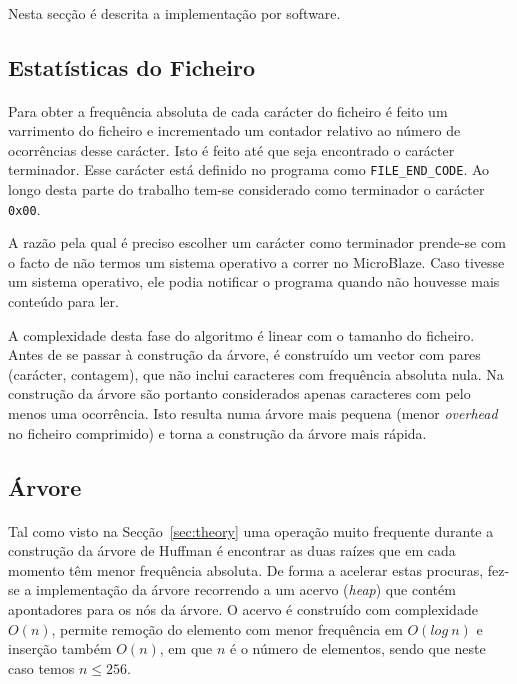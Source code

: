 \paragraph{} Nesta secção é descrita a implementação por software.

\subsection{Estatísticas do Ficheiro}

\paragraph{} Para obter a frequência absoluta de cada carácter do ficheiro é feito um varrimento do ficheiro e incrementado um contador relativo ao número de ocorrências desse carácter. Isto é feito até que seja encontrado o carácter terminador. Esse carácter está definido no programa como \texttt{FILE\_END\_CODE}. Ao longo desta parte do trabalho tem-se considerado como terminador o carácter \texttt{0x00}.

A razão pela qual é preciso escolher um carácter como terminador prende-se com o facto de não termos um sistema operativo a correr no MicroBlaze. Caso tivesse um sistema operativo, ele podia notificar o programa quando não houvesse mais conteúdo para ler.

A complexidade desta fase do algoritmo é linear com o tamanho do ficheiro. Antes de se passar à construção da árvore, é construído um vector com pares (carácter, contagem), que não inclui caracteres com frequência absoluta nula. Na construção da árvore são portanto considerados apenas caracteres com pelo menos uma ocorrência. Isto resulta numa árvore mais pequena (menor \textit{overhead} no ficheiro comprimido) e torna a construção da árvore mais rápida.

\subsection{Árvore}

\paragraph{} Tal como visto na Secção~\ref{sec:theory} uma operação muito frequente durante a construção da árvore de Huffman é encontrar as duas raízes que em cada momento têm menor frequência absoluta. De forma a acelerar estas procuras, fez-se a implementação da árvore recorrendo a um acervo (\textit{heap}) que contém apontadores para os nós da árvore. O acervo é construído com complexidade $O(n)$, permite remoção do elemento com menor frequência em $O(log\ n)$ e inserção também $O(n)$, em que $n$ é o número de elementos, sendo que neste caso temos $n \leq 256$.

